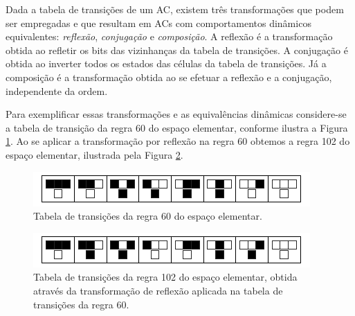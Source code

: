 \documentclass[12pt, a4paper]{article}
\begin{document}
Dada a tabela de transições de um AC, existem três transformações que podem ser empregadas e que resultam em ACs com comportamentos dinâmicos equivalentes: \textit{reflexão}, \textit{conjugação} e \textit{composição}. A reflexão é a transformação obtida ao refletir os bits das vizinhanças da tabela de transições. A conjugação é obtida ao inverter todos os estados das células da tabela de transições. Já a composição é a transformação obtida ao se efetuar a reflexão e a conjugação, independente da ordem.

Para exemplificar essas transformações e as equivalências dinâmicas considere-se a tabela de transição da regra 60 do espaço elementar, conforme ilustra a Figura \ref{fig:table60}. Ao se aplicar a transformação por reflexão na regra 60 obtemos a regra 102 do espaço elementar, ilustrada pela Figura \ref{fig:table102}.

	\begin{figure}[h!]
	  \centering
	  \includegraphics[width=.5\textwidth]{fig_ruleIcon60.png}
	  \caption{Tabela de transições da regra 60 do espaço elementar.}
	  \label{fig:table60}
	\end{figure}

	\begin{figure}[h!]
	  \centering
	  \includegraphics[width=.5\textwidth]{fig_ruleIcon102.png}
	  \caption{Tabela de transições da regra 102 do espaço elementar, obtida através da transformação de reflexão aplicada na tabela de transições da regra 60.}
	  \label{fig:table102}
	\end{figure}


\end{document}
